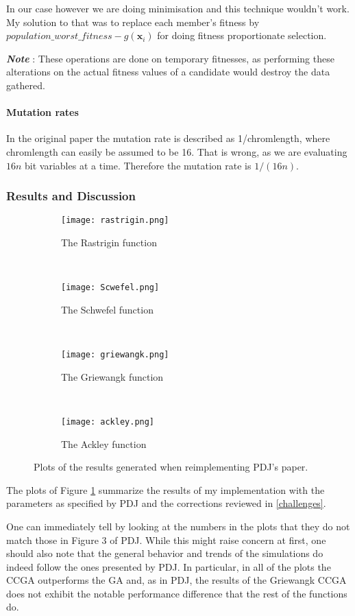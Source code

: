 \documentclass[12pt,a4paper,onecolumn]{article}
\begin{document}
In our case however we are doing minimisation and this technique wouldn't work. My solution to that was to replace each member's fitness by $population\_worst\_fitness - g(\mathbf{x}_i)$ for doing fitness proportionate selection.

\emph{\textbf{Note}} : These operations are done on temporary fitnesses, as performing these alterations on the actual fitness values of a candidate would destroy the data gathered.
\paragraph{Mutation rates} 
\label{res_orig}In the original paper the mutation rate is described as 1/chromlength, where chromlength can easily be assumed to be 16. That is wrong, as we are evaluating $16n$ bit variables at a time. Therefore the mutation rate is $1/(16n)$.

\subsubsection{Results and Discussion}
\begin{figure}[h]
	\begin{subfigure}[t]{0.5\textwidth}
		\texttt{[image: rastrigin.png]}
		\caption{The Rastrigin function}
	\end{subfigure}
	~
	\begin{subfigure}[t]{0.5\textwidth}
		\texttt{[image: Scwefel.png]}
		\caption{The Schwefel function}
	\end{subfigure}	\\
	
	\begin{subfigure}[t]{0.5\textwidth}
		\texttt{[image: griewangk.png]}
		\caption{The Griewangk function}
	\end{subfigure}
	~
	\begin{subfigure}[t]{0.5\textwidth}
		\texttt{[image: ackley.png]}
		\caption{The Ackley function}
	\end{subfigure}
\caption{Plots of the results generated when reimplementing PDJ's paper.}
\label{result_plots}	
\end{figure}

The plots of Figure \ref{result_plots} summarize the results of my implementation with the parameters as specified by PDJ and the corrections reviewed in \ref{challenges}.

One can immediately tell by looking at the numbers in the plots that they do not match those in Figure 3 of PDJ\cite{PDJ}. While this might raise concern at first, one should also note that the general behavior and trends of the simulations do indeed follow the ones presented by PDJ. In particular, in all of the plots the CCGA outperforms the GA and, as in PDJ, the results of the Griewangk CCGA does not exhibit the notable performance difference that the rest of the functions do.\\
\end{document}
